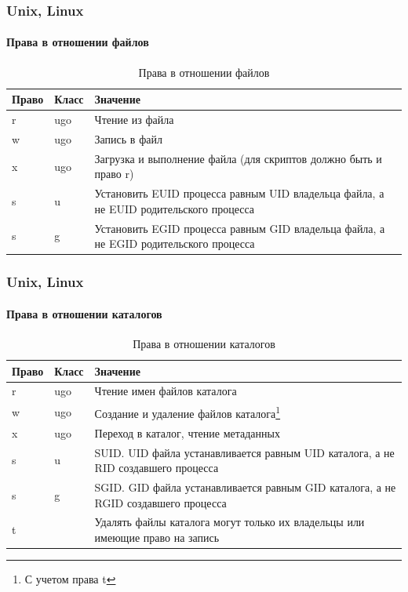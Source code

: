 \begin{frame}
    \frametitle{Unix, Linux}
    \framesubtitle{Права в отношении файлов}
    
    \begin{table}[ht]
        \caption{Права в отношении файлов}\label{t:nixRightsFile}
        \centering
        \begin{tabular}[c]{|l|l|p{}|}
            \hline\hline
            Право & Класс & Значение   \\
            \hline\hline
            r     & ugo & Чтение из файла \\ \hline
            w     & ugo & Запись в файл \\ \hline
            x     & ugo & Загрузка и выполнение файла (для скриптов должно быть и право r)\\ \hline
            s     & u   & Установить EUID процесса равным UID владельца файла, а не EUID 
                          родительского процесса \\ \hline
            s     & g   & Установить EGID процесса равным GID владельца файла, а не EGID 
                          родительского процесса \\ \hline
        \end{tabular}
    \end{table}
\end{frame}


\begin{frame}
    \frametitle{Unix, Linux}
    \framesubtitle{Права в отношении каталогов}
    
    \begin{table}[ht]
        \caption{Права в отношении каталогов}\label{t:nixRightsCatalog}
        \centering
        \begin{tabular}[c]{|l|l|p{}|}
            \hline\hline
            Право & Класс & Значение   \\
            \hline\hline
            r     & ugo & Чтение имен файлов каталога \\ \hline
            w     & ugo & Создание и удаление файлов каталога\footnote{С учетом права t} \\ \hline
            x     & ugo & Переход в каталог, чтение метаданных \\ \hline
            s     & u   & SUID. UID файла устанавливается равным UID каталога, а не RID создавшего процесса \\ \hline
            s     & g   & SGID. GID файла  устанавливается равным GID каталога, а не RGID создавшего процесса \\ \hline
            t     &     & Удалять файлы каталога могут только их владельцы 
                          или имеющие право на запись \\ \hline
        \end{tabular}
    \end{table}
\end{frame}


